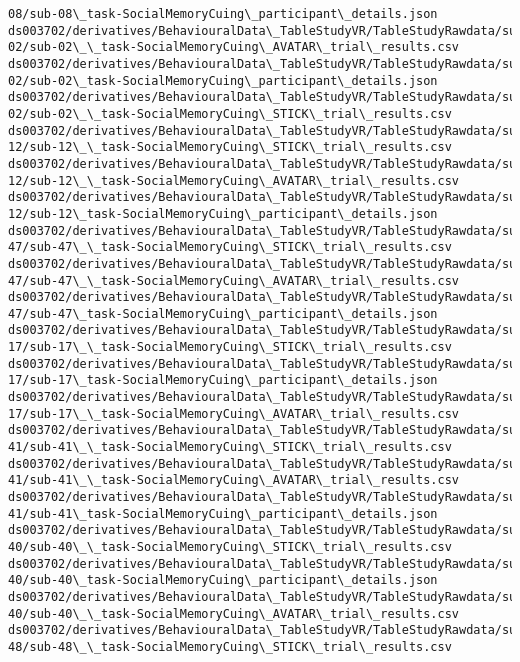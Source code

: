 \documentclass[11pt]{article}
\begin{document}
\begin{Verbatim}[commandchars=\\\{\}]
08/sub-08\_task-SocialMemoryCuing\_participant\_details.json
ds003702/derivatives/BehaviouralData\_TableStudyVR/TableStudyRawdata/sub-
02/sub-02\_\_task-SocialMemoryCuing\_AVATAR\_trial\_results.csv
ds003702/derivatives/BehaviouralData\_TableStudyVR/TableStudyRawdata/sub-
02/sub-02\_task-SocialMemoryCuing\_participant\_details.json
ds003702/derivatives/BehaviouralData\_TableStudyVR/TableStudyRawdata/sub-
02/sub-02\_\_task-SocialMemoryCuing\_STICK\_trial\_results.csv
ds003702/derivatives/BehaviouralData\_TableStudyVR/TableStudyRawdata/sub-
12/sub-12\_\_task-SocialMemoryCuing\_STICK\_trial\_results.csv
ds003702/derivatives/BehaviouralData\_TableStudyVR/TableStudyRawdata/sub-
12/sub-12\_\_task-SocialMemoryCuing\_AVATAR\_trial\_results.csv
ds003702/derivatives/BehaviouralData\_TableStudyVR/TableStudyRawdata/sub-
12/sub-12\_task-SocialMemoryCuing\_participant\_details.json
ds003702/derivatives/BehaviouralData\_TableStudyVR/TableStudyRawdata/sub-
47/sub-47\_\_task-SocialMemoryCuing\_STICK\_trial\_results.csv
ds003702/derivatives/BehaviouralData\_TableStudyVR/TableStudyRawdata/sub-
47/sub-47\_\_task-SocialMemoryCuing\_AVATAR\_trial\_results.csv
ds003702/derivatives/BehaviouralData\_TableStudyVR/TableStudyRawdata/sub-
47/sub-47\_task-SocialMemoryCuing\_participant\_details.json
ds003702/derivatives/BehaviouralData\_TableStudyVR/TableStudyRawdata/sub-
17/sub-17\_\_task-SocialMemoryCuing\_STICK\_trial\_results.csv
ds003702/derivatives/BehaviouralData\_TableStudyVR/TableStudyRawdata/sub-
17/sub-17\_task-SocialMemoryCuing\_participant\_details.json
ds003702/derivatives/BehaviouralData\_TableStudyVR/TableStudyRawdata/sub-
17/sub-17\_\_task-SocialMemoryCuing\_AVATAR\_trial\_results.csv
ds003702/derivatives/BehaviouralData\_TableStudyVR/TableStudyRawdata/sub-
41/sub-41\_\_task-SocialMemoryCuing\_STICK\_trial\_results.csv
ds003702/derivatives/BehaviouralData\_TableStudyVR/TableStudyRawdata/sub-
41/sub-41\_\_task-SocialMemoryCuing\_AVATAR\_trial\_results.csv
ds003702/derivatives/BehaviouralData\_TableStudyVR/TableStudyRawdata/sub-
41/sub-41\_task-SocialMemoryCuing\_participant\_details.json
ds003702/derivatives/BehaviouralData\_TableStudyVR/TableStudyRawdata/sub-
40/sub-40\_\_task-SocialMemoryCuing\_STICK\_trial\_results.csv
ds003702/derivatives/BehaviouralData\_TableStudyVR/TableStudyRawdata/sub-
40/sub-40\_task-SocialMemoryCuing\_participant\_details.json
ds003702/derivatives/BehaviouralData\_TableStudyVR/TableStudyRawdata/sub-
40/sub-40\_\_task-SocialMemoryCuing\_AVATAR\_trial\_results.csv
ds003702/derivatives/BehaviouralData\_TableStudyVR/TableStudyRawdata/sub-
48/sub-48\_\_task-SocialMemoryCuing\_STICK\_trial\_results.csv

\end{Verbatim}
\end{document}
